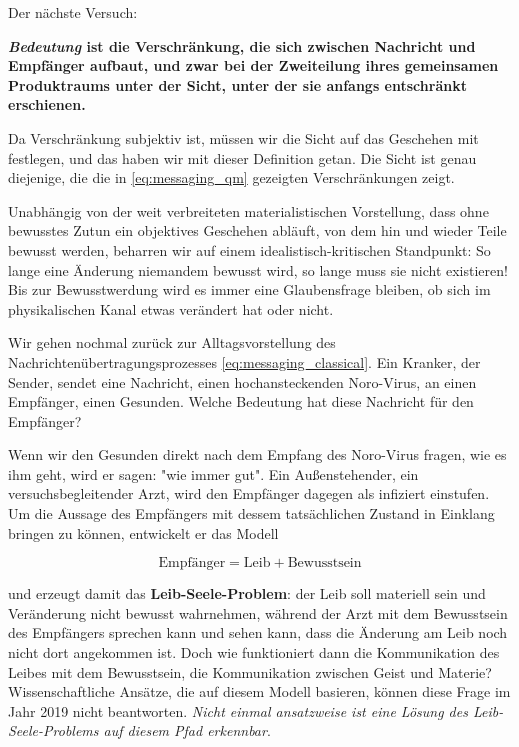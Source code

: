 \documentclass[12pt]{book}
\begin{document}
Der nächste Versuch: 

\textbf{\emph{Bedeutung} ist die Verschränkung, die sich zwischen Nachricht und Empfänger aufbaut, und zwar bei der Zweiteilung ihres gemeinsamen Produktraums unter der Sicht, unter der sie anfangs entschränkt erschienen.}

Da Verschränkung subjektiv ist, müssen wir die Sicht auf das Geschehen mit festlegen, und das haben wir mit dieser Definition getan. Die Sicht ist genau diejenige, die die in  \eqref{eq:messaging_qm} gezeigten Verschränkungen zeigt.

Unabhängig von der weit verbreiteten materialistischen Vorstellung, dass ohne bewusstes Zutun ein objektives Geschehen abläuft, von dem hin und wieder Teile bewusst werden, beharren wir auf einem idealistisch-kritischen Standpunkt: So lange eine Änderung niemandem bewusst wird, so lange muss sie nicht existieren! Bis zur Bewusstwerdung wird es immer eine Glaubensfrage bleiben, ob sich im physikalischen Kanal etwas verändert hat oder nicht. 

Wir gehen nochmal zurück zur Alltagsvorstellung des Nachrichtenübertragungsprozesses \eqref{eq:messaging_classical}. Ein Kranker, der Sender, sendet eine Nachricht, einen hochansteckenden Noro-Virus, an einen Empfänger, einen Gesunden. Welche Bedeutung hat diese Nachricht für den Empfänger?

Wenn wir den Gesunden direkt nach dem Empfang des Noro-Virus fragen, wie es ihm geht, wird er sagen: "wie immer gut". Ein Außenstehender, ein versuchsbegleitender Arzt, wird den Empfänger dagegen als infiziert einstufen. Um die Aussage des Empfängers mit dessem tatsächlichen Zustand in Einklang bringen zu können, entwickelt er das Modell

\begin{equation} 
\text{Empfänger} = \text{Leib} + \text{Bewusstsein}
\end{equation} 

und erzeugt damit das \textbf{Leib-Seele-Problem}: der Leib soll materiell sein und Veränderung nicht bewusst wahrnehmen, während der Arzt mit dem Bewusstsein des Empfängers sprechen kann und sehen kann, dass die Änderung am Leib noch nicht dort angekommen ist. Doch wie funktioniert dann die Kommunikation des Leibes mit dem Bewusstsein, die Kommunikation zwischen Geist und Materie? Wissenschaftliche Ansätze, die auf diesem Modell basieren, können diese Frage im Jahr 2019 nicht beantworten. \emph{Nicht einmal ansatzweise ist eine Lösung des Leib-Seele-Problems auf diesem Pfad erkennbar}.
\end{document}
